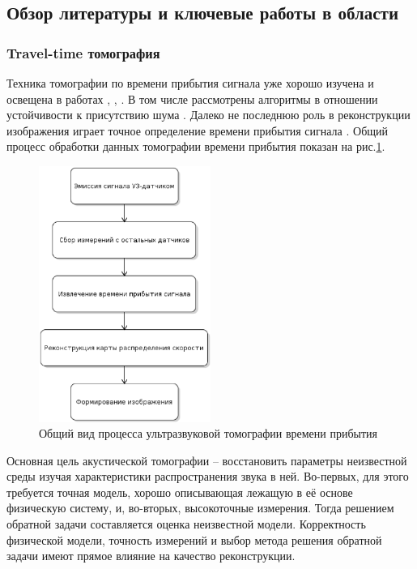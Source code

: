 \documentclass[14pt]{matmex-diploma}
\begin{document}
\subsection{Обзор литературы и ключевые работы в области}

\subsubsection{Travel-time томография} \label{sec:travel_times_descr}
Техника томографии по времени прибытия сигнала уже хорошо изучена и освещена в работах \cite{Kunyansky2012111}, \cite{quan2007sound}, \cite{hopp2014breast}. В том числе рассмотрены алгоритмы в отношении устойчивости к присутствию шума \cite{hormati2010robust}. Далеко не последнюю роль в реконструкции изображения играет точное определение времени прибытия сигнала \cite{li2009improved}. Общий процесс обработки данных томографии времени прибытия показан на рис.\ref{fig:us_process}.
\begin{figure}[h]
\centering
    \includegraphics[width=0.5\textwidth]{pics_eps/us_process.eps}
    \caption{\small Общий вид процесса ультразвуковой томографии времени прибытия}
    \label{fig:us_process}
\end{figure}
Основная цель акустической томографии -- восстановить параметры неизвестной среды изучая характеристики распространения звука в ней. Во-первых, для этого требуется точная модель, хорошо описывающая лежащую в её основе физическую систему, и, во-вторых, высокоточные измерения. Тогда решением обратной задачи составляется оценка неизвестной модели. Корректность физической модели, точность измерений и выбор метода решения обратной задачи имеют прямое влияние на качество реконструкции. \\
\end{document}
